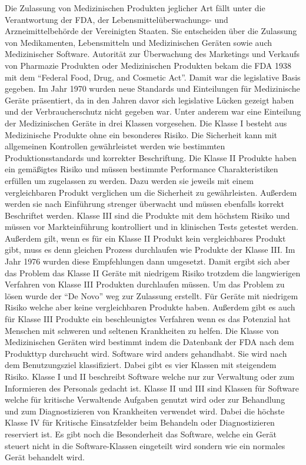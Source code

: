 Die Zulassung von Medizinischen Produkten jeglicher Art fällt unter die Verantwortung der FDA, der Lebensmittelüberwachungs- und Arzneimittelbehörde  der Vereinigten Staaten. Sie entscheiden über die Zulassung von Medikamenten, Lebensmitteln und Medizinischen Geräten sowie auch Medizinischer Software. Autorität zur Überwachung des Marketings und Verkaufs von Pharmazie Produkten oder Medizinischen Produkten bekam die FDA 1938 mit dem "`Federal Food, Drug, and Cosmetic Act"'. Damit war die legislative Basis gegeben. Im Jahr 1970 wurden neue Standards und Einteilungen für Medizinische Geräte präsentiert, da in den Jahren davor sich legislative Lücken gezeigt haben und der Verbraucherschutz nicht gegeben war. Unter anderem war eine Einteilung der Medizinischen Geräte in drei Klassen vorgesehen. Die Klasse I besteht aus Medizinische Produkte ohne ein besonderes Risiko. Die Sicherheit kann mit allgemeinen Kontrollen gewährleistet werden wie bestimmten Produktionsstandards und korrekter Beschriftung. Die Klasse II Produkte haben ein gemäßigtes Risiko und müssen bestimmte Performance Charakteristiken erfüllen um zugelassen zu werden. Dazu werden sie jeweils mit einem vergleichbaren Produkt verglichen um die Sicherheit zu gewährleisten. Außerdem werden sie nach Einführung strenger überwacht und müssen ebenfalls korrekt Beschriftet werden. Klasse III sind die Produkte mit dem höchstem Risiko und müssen vor Markteinführung kontrolliert und in klinischen Tests getestet werden. Außerdem gilt, wenn es für ein Klasse II Produkt kein vergleichbares Produkt gibt, muss es denn gleichen Prozess durchlaufen wie Produkte der Klasse III. Im Jahr 1976 wurden diese Empfehlungen dann umgesetzt. Damit ergibt sich aber das Problem das Klasse II Geräte mit niedrigem Risiko trotzdem die langwierigen Verfahren von Klasse III Produkten durchlaufen müssen. Um das Problem zu lösen wurde der "`De Novo"'\cite{usa_ai_approval} weg zur Zulassung erstellt. Für Geräte mit niedrigem Risiko welche aber keine vergleichbaren Produkte haben. Außerdem gibt es auch für Klasse III Produkte ein beschleunigtes Verfahren wenn es das Potenzial hat Menschen mit schweren und seltenen Krankheiten zu helfen. Die Klasse von Medizinischen Geräten wird bestimmt indem die Datenbank der FDA nach dem Produkttyp durchsucht wird. Software wird anders gehandhabt. Sie wird nach dem Benutzungsziel klassifiziert. Dabei gibt es vier Klassen mit steigendem Risiko. Klasse I und II beschreibt Software welche nur zur Verwaltung oder zum Informieren des Personals gedacht ist. Klasse II und III sind Klassen für Software welche für kritische Verwaltende Aufgaben genutzt wird oder zur Behandlung und zum Diagnostizieren von Krankheiten verwendet wird. Dabei die höchste Klasse IV für Kritische Einsatzfelder beim Behandeln oder Diagnostizieren reserviert ist. Es gibt noch die Besonderheit das Software, welche ein Gerät steuert nicht in die Software-Klassen eingeteilt wird sondern wie ein normales Gerät behandelt wird. \cite{usa_ai_approval}
